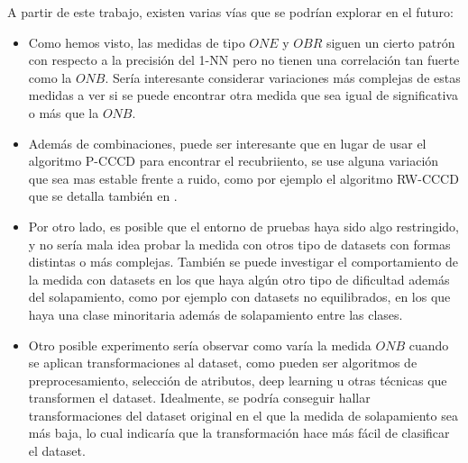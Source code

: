\documentclass[a4paper,12pt]{report}
\theoremstyle{definition}
\begin{document}
A partir de este trabajo, existen varias vías que se podrían explorar en el futuro:
\begin{itemize}
\item Como hemos visto, las medidas de tipo $ONE$ y $OBR$ siguen un cierto patrón con respecto a la precisión del 1-NN pero no tienen una correlación tan fuerte como la $ONB$. Sería interesante considerar variaciones más complejas de estas medidas a ver si se puede encontrar otra medida que sea igual de significativa o más que la $ONB$.
\item Además de combinaciones, puede ser interesante que en lugar de usar el algoritmo P-CCCD para encontrar el recubriiento, se use alguna variación que sea mas estable frente a ruido, como por ejemplo el algoritmo RW-CCCD que se detalla también en \cite{manukyan2016classification}.
\item Por otro lado, es posible que el entorno de pruebas haya sido algo restringido, y no sería mala idea probar la medida con otros tipo de datasets con formas distintas o más complejas. También se puede investigar el comportamiento de la medida con datasets en los que haya algún otro tipo de dificultad además del solapamiento, como por ejemplo con datasets no equilibrados, en los que haya una clase minoritaria además de solapamiento entre las clases.
\item Otro posible experimento sería observar como varía la medida $ONB$ cuando se aplican transformaciones al dataset, como pueden ser algoritmos de preprocesamiento, selección de atributos, deep learning u otras técnicas que transformen el dataset. Idealmente, se podría conseguir hallar transformaciones del dataset original en el que la medida de solapamiento sea más baja, lo cual indicaría que la transformación hace más fácil de clasificar el dataset.
\end{itemize}


\clearpage%
\printbibliography
\end{document}
